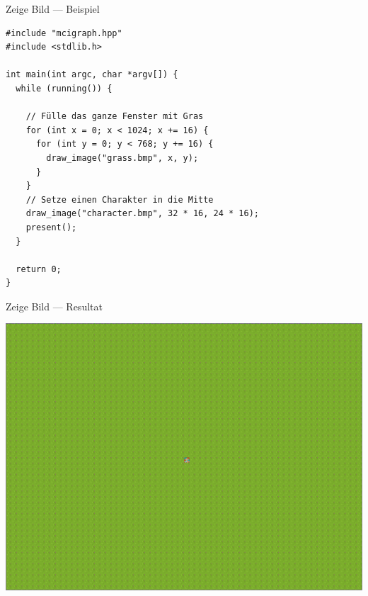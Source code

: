 \documentclass[presentation]{beamer}
\begin{document}
\begin{frame}[label={sec:orgf71d690},fragile]{Zeige Bild --- Beispiel}
 \begin{verbatim}
#include "mcigraph.hpp"
#include <stdlib.h>

int main(int argc, char *argv[]) {
  while (running()) {

    // Fülle das ganze Fenster mit Gras
    for (int x = 0; x < 1024; x += 16) {
      for (int y = 0; y < 768; y += 16) {
        draw_image("grass.bmp", x, y);
      }
    }
    // Setze einen Charakter in die Mitte
    draw_image("character.bmp", 32 * 16, 24 * 16);
    present();
  }

  return 0;
}
\end{verbatim}
\end{frame}
\begin{frame}[label={sec:org87ac788}]{Zeige Bild --- Resultat}
\begin{center}\begin{center}
\includegraphics[width=.9\linewidth]{data/34/e7b7d1-9fa0-4cb5-a8fb-42825d77a5f2/screenshot-20170316-144857.png}
\end{center}\end{center}
\end{frame}
\end{document}
